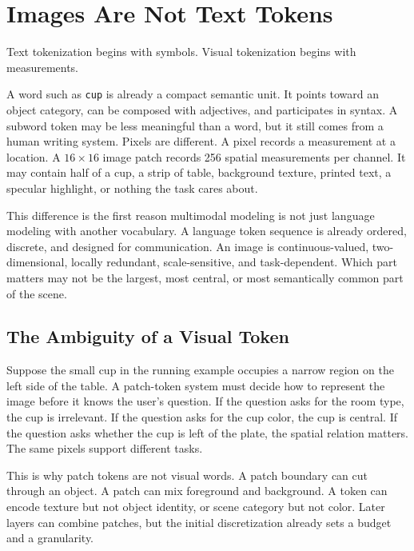 \section{Images Are Not Text Tokens}
\label{sec:ch23-images-not-text}

Text tokenization begins with symbols. Visual tokenization begins with measurements.

A word such as \texttt{cup} is already a compact semantic unit. It points toward an object category, can be composed with adjectives, and participates in syntax. A subword token may be less meaningful than a word, but it still comes from a human writing system. Pixels are different. A pixel records a measurement at a location. A $16 \times 16$ image patch records 256 spatial measurements per channel. It may contain half of a cup, a strip of table, background texture, printed text, a specular highlight, or nothing the task cares about.

This difference is the first reason multimodal modeling is not just language modeling with another vocabulary. A language token sequence is already ordered, discrete, and designed for communication. An image is continuous-valued, two-dimensional, locally redundant, scale-sensitive, and task-dependent. Which part matters may not be the largest, most central, or most semantically common part of the scene.

\subsection{The Ambiguity of a Visual Token}

Suppose the small cup in the running example occupies a narrow region on the left side of the table. A patch-token system must decide how to represent the image before it knows the user's question. If the question asks for the room type, the cup is irrelevant. If the question asks for the cup color, the cup is central. If the question asks whether the cup is left of the plate, the spatial relation matters. The same pixels support different tasks.

This is why patch tokens are not visual words. A patch boundary can cut through an object. A patch can mix foreground and background. A token can encode texture but not object identity, or scene category but not color. Later layers can combine patches, but the initial discretization already sets a budget and a granularity.

